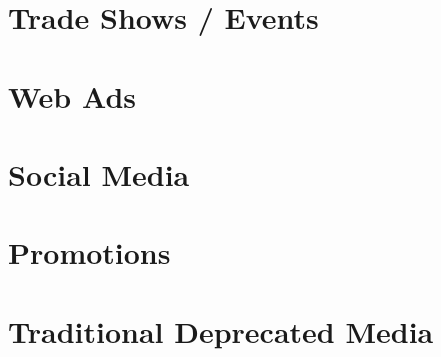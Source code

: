%
%
%
%
%

\section{Trade Shows / Events}

\section{Web Ads}

\section{Social Media}

\section{Promotions}

\section{Traditional Deprecated Media}

